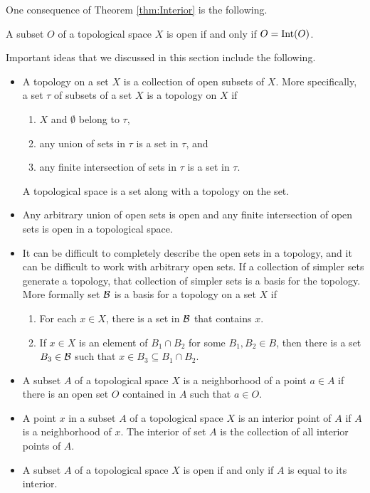 One consequence of Theorem \ref{thm:Interior} is the following.

\begin{corollary} A subset $O$ of a topological space $X$ is open if and only if $O = \text{Int}(O)$. 
\end{corollary}
 
Important ideas that we discussed in this section include the following.
\begin{itemize}
\item A topology on a set $X$ is a collection of open subsets of $X$. More specifically, a set $\tau$ of subsets of a set $X$ is a topology on $X$ if 
	\begin{enumerate}
	\item $X$ and $\emptyset$ belong to $\tau$,
	\item any union of sets in $\tau$ is a set in $\tau$, and
	\item any finite intersection of sets in $\tau$ is a set in $\tau$.
	\end{enumerate}
A topological space is a set along with a topology on the set. 
\item Any arbitrary union of open sets is open and any finite intersection of open sets is open in a topological space. 
\item It can be difficult to completely describe the open sets in a topology, and it can be difficult to work with arbitrary open sets. If a collection of simpler sets generate a topology, that collection of simpler sets is a basis for the topology. More formally 
 set $\mathcal{B}$ is a basis for a topology on a set $X$ if 
	\begin{enumerate}
	\item For each $x \in X$, there is a set in $\mathcal{B}$ that contains $x$.
	\item If $x \in X$ is an element of $B_1 \cap B_2$ for some $B_1, B_2 \in B$, then there is a set $B_3 \in \mathcal{B}$ such that $x \in B_3 \subseteq B_1 \cap B_2$. 
	\end{enumerate}
\item A subset $A$ of a topological space $X$ is a neighborhood of a point $a \in A$ if there is an open set $O$ contained in $A$ such that $a \in O$. 
\item A point $x$ in a subset $A$ of a topological space $X$ is an interior point of $A$ if $A$ is a neighborhood of $x$. The interior of set $A$ is the collection of all interior points of $A$. 
\item A subset $A$ of a topological space $X$ is open if and only if $A$ is equal to its interior. 
\end{itemize}

